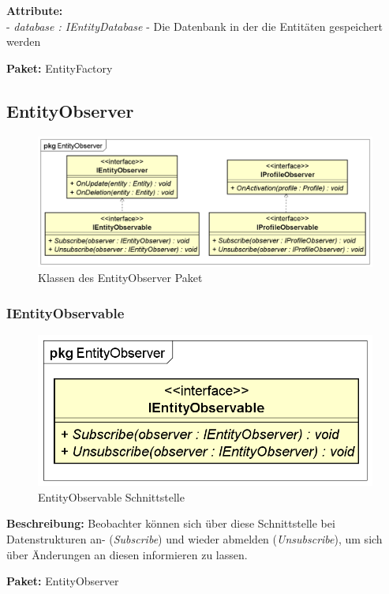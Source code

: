\documentclass[a4paper]{scrreprt}
\begin{document}
\textbf{Attribute:}\\
- \textit{database : IEntityDatabase} - Die Datenbank in der die Entitäten gespeichert werden

\textbf{Paket:} EntityFactory


\subsection{EntityObserver}
\begin{figure}[H]
\centering
\includegraphics[width=0.75\textheight]{graphics/Klassendiagramme/Model/EntityObserverPackage.png}
\caption{Klassen des EntityObserver Paket}
\end{figure}

\subsubsection{IEntityObservable}
\begin{figure}[H]
\centering
\includegraphics[width=0.75\textheight]{graphics/Klassendiagramme/Model/IEntityObservable.png}
\caption{EntityObservable Schnittstelle}
\end{figure}
\textbf{Beschreibung:} Beobachter können sich über diese Schnittstelle bei Datenstrukturen an- (\textit{Subscribe}) und wieder abmelden (\textit{Unsubscribe}), um sich über Änderungen an diesen informieren zu lassen.

\textbf{Paket:} EntityObserver
\end{document}
